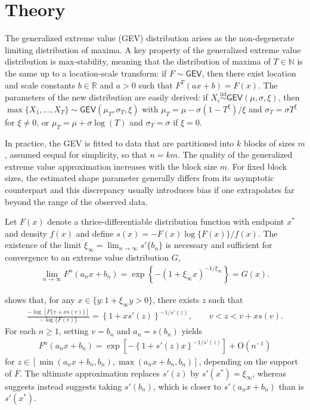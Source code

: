 \documentclass[]{book}
\begin{document}
\hypertarget{theory}{%
\section{Theory}\label{theory}}

The generalized extreme value (GEV) distribution arises as the non-degenerate limiting distribution of maxima. A key property of the generalized extreme value distribution is max-stability, meaning that the distribution of maxima of \(T \in \mathbb{N}\) is the same up to a location-scale transform: if \(F \sim \mathsf{GEV}\), then there exist location and scale constants \(b \in \mathbb{R}\) and \(a>0\) such that \(F^T(ax+b) = F(x)\). The parameters of the new distribution are easily derived: if \(X_i \stackrel{\mathrm{iid}}{\sim}\mathsf{GEV}(\mu,\sigma, \xi)\), then \(\max\{X_1, \ldots, X_T\} \sim \mathsf{GEV}(\mu_T, \sigma_T, \xi)\) with \(\mu_T = \mu - \sigma(1-T^\xi)/\xi\) and \(\sigma_T = \sigma T^\xi\) for \(\xi \neq 0\), or \(\mu_T = \mu +\sigma \log(T)\) and \(\sigma_T = \sigma\) if \(\xi=0\).

In practice, the GEV is fitted to data that are partitioned into \(k\) blocks of sizes \(m\), assumed eequal for simplicity, so that \(n = km\). The quality of the generalized extreme value approximation increases with the block size \(m\). For fixed block sizes, the estimated shape parameter generally differs from its asymptotic counterpart and this discrepancy usually introduces bias if one extrapolates far beyond the range of the observed data.

Let \(F(x)\) denote a thrice-differentiable distribution function with endpoint \(x^*\) and density \(f(x)\) and define \(s(x)=-F(x)\log\{F(x)\}/f(x)\). The existence of the limit \(\xi_{\infty} = \lim_{n \to \infty} s'\{b_n\}\) is necessary and sufficient for convergence to an extreme value distribution \(G\),
\begin{align*}
 \lim_{n \to \infty} F^n(a_nx+b_n) = \exp\left\{-(1+\xi_\infty x)^{-1/\xi_\infty}\right\}=G(x).
\end{align*}

\citet{Smith:1987} shows that, for any \(x \in \{y:1+\xi_\infty y >0\}\), there exists \(z\) such that
\begin{align*}
   \frac{-\log[F\{v+xs(v)\}]}{-\log\{F(v)\}} = \left\{1+xs'(z)\right\}^{-1/s'(z)}, \qquad v < z < v+xs(v).
\end{align*}
For each \(n \geq 1\), setting \(v=b_n\) and \(a_n=s(b_n)\) yields
\begin{align*}
   F^n(a_nx+b_n)=\exp\left[-\left\{1+s'(z)x\right\}^{-1/s'(z)}\right] + \mathrm{O}(n^{-1})
\end{align*}
for \(z \in [\min(a_nx+b_n, b_n), \max(a_nx+b_n, b_n)]\), depending on the support of \(F\). The ultimate approximation replaces \(s'(z)\) by \(s'(x^*)=\xi_{\infty}\), whereas \citet{Smith:1987} suggests instead suggests taking \(s'(b_n)\), which is closer to \(s'(a_nx+b_n)\) than is \(s'(x^*)\).
\end{document}
